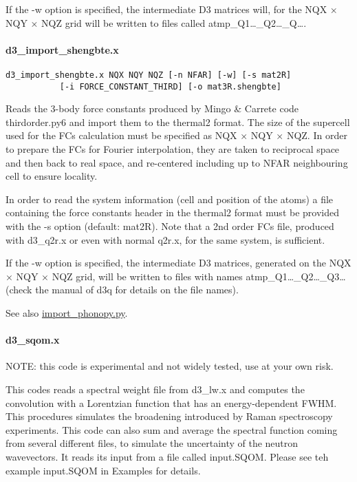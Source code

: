 \documentclass[
]{article}
\begin{document}
If the -w option is specified, the intermediate D3 matrices will, for
the NQX × NQY × NQZ grid will be written to files called
atmp\_Q1\ldots\_Q2\ldots\_Q\ldots.

\hypertarget{d3_import_shengbte.x}{%
\paragraph{d3\_import\_shengbte.x}\label{d3_import_shengbte.x}}

\begin{verbatim}
d3_import_shengbte.x NQX NQY NQZ [-n NFAR] [-w] [-s mat2R]
           [-i FORCE_CONSTANT_THIRD] [-o mat3R.shengbte] 
\end{verbatim}

Reads the 3-body force constants produced by Mingo \& Carrete code
thirdorder.py6 and import them to the thermal2 format. The size of the
supercell used for the FCs calculation must be specified as NQX × NQY ×
NQZ. In order to prepare the FCs for Fourier interpolation, they are
taken to reciprocal space and then back to real space, and re-centered
including up to NFAR neighbouring cell to ensure locality.

In order to read the system information (cell and position of the atoms)
a file containing the force constants header in the thermal2 format must
be provided with the -s option (default: mat2R). Note that a 2nd order
FCs file, produced with d3\_q2r.x or even with normal q2r.x, for the
same system, is sufficient.

If the -w option is specified, the intermediate D3 matrices, generated
on the NQX × NQY × NQZ grid, will be written to files with names
atmp\_Q1\ldots\_Q2\ldots\_Q3\ldots{} (check the manual of d3q for
details on the file names).

See also \protect\hyperlink{import_phonopypy}{import\_phonopy.py}.

\hypertarget{d3_sqom.x}{%
\paragraph{d3\_sqom.x}\label{d3_sqom.x}}

NOTE: this code is experimental and not widely tested, use at your own
risk.

This codes reads a spectral weight file from d3\_lw.x and computes the
convolution with a Lorentzian function that has an energy-dependent
FWHM. This procedures simulates the broadening introduced by Raman
spectroscopy experiments. This code can also sum and average the
spectral function coming from several different files, to simulate the
uncertainty of the neutron wavevectors. It reads its input from a file
called input.SQOM. Please see teh example input.SQOM in Examples for
details.
\end{document}
